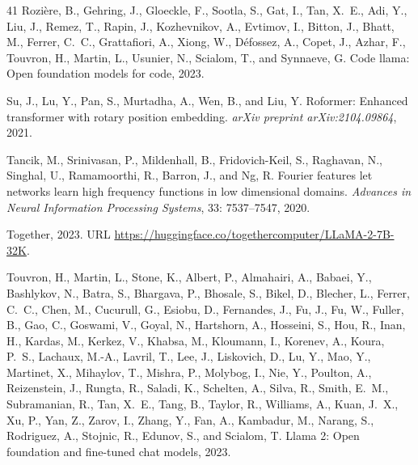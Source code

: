 \documentclass{article}
\theoremstyle{plain}
\theoremstyle{definition}
\theoremstyle{remark}
\begin{document}
\begin{thebibliography}{41}
Rozière, B., Gehring, J., Gloeckle, F., Sootla, S., Gat, I., Tan, X.~E., Adi,
  Y., Liu, J., Remez, T., Rapin, J., Kozhevnikov, A., Evtimov, I., Bitton, J.,
  Bhatt, M., Ferrer, C.~C., Grattafiori, A., Xiong, W., Défossez, A., Copet,
  J., Azhar, F., Touvron, H., Martin, L., Usunier, N., Scialom, T., and
  Synnaeve, G.
\newblock Code llama: Open foundation models for code, 2023.

Su, J., Lu, Y., Pan, S., Murtadha, A., Wen, B., and Liu, Y.
\newblock Roformer: Enhanced transformer with rotary position embedding.
\newblock \emph{arXiv preprint arXiv:2104.09864}, 2021.

Tancik, M., Srinivasan, P., Mildenhall, B., Fridovich-Keil, S., Raghavan, N.,
  Singhal, U., Ramamoorthi, R., Barron, J., and Ng, R.
\newblock Fourier features let networks learn high frequency functions in low
  dimensional domains.
\newblock \emph{Advances in Neural Information Processing Systems},
  33: 7537--7547, 2020.

Together, 2023.
\newblock URL \url{https://huggingface.co/togethercomputer/LLaMA-2-7B-32K}.

Touvron, H., Martin, L., Stone, K., Albert, P., Almahairi, A., Babaei, Y.,
  Bashlykov, N., Batra, S., Bhargava, P., Bhosale, S., Bikel, D., Blecher, L.,
  Ferrer, C.~C., Chen, M., Cucurull, G., Esiobu, D., Fernandes, J., Fu, J., Fu,
  W., Fuller, B., Gao, C., Goswami, V., Goyal, N., Hartshorn, A., Hosseini, S.,
  Hou, R., Inan, H., Kardas, M., Kerkez, V., Khabsa, M., Kloumann, I., Korenev,
  A., Koura, P.~S., Lachaux, M.-A., Lavril, T., Lee, J., Liskovich, D., Lu, Y.,
  Mao, Y., Martinet, X., Mihaylov, T., Mishra, P., Molybog, I., Nie, Y.,
  Poulton, A., Reizenstein, J., Rungta, R., Saladi, K., Schelten, A., Silva,
  R., Smith, E.~M., Subramanian, R., Tan, X.~E., Tang, B., Taylor, R.,
  Williams, A., Kuan, J.~X., Xu, P., Yan, Z., Zarov, I., Zhang, Y., Fan, A.,
  Kambadur, M., Narang, S., Rodriguez, A., Stojnic, R., Edunov, S., and
  Scialom, T.
\newblock Llama 2: Open foundation and fine-tuned chat models, 2023.


\end{thebibliography}
\end{document}
